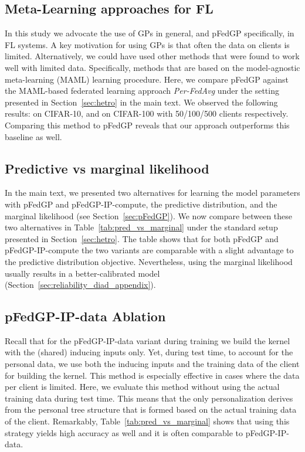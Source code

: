 \documentclass{article}
\def\Secref#1{Section~\ref{#1}}
\newcommand{\tblref}[1]{Table~\ref{#1}}
\begin{document}
\subsection{Meta-Learning approaches for FL}
In this study we advocate the use of GPs in general, and pFedGP specifically, in FL systems. A key motivation for using GPs is that often the data on clients is limited. Alternatively, we could have used other methods that were found to work well with limited data. Specifically, methods that are based on the model-agnostic meta-learning (MAML) \cite{li2017meta} learning procedure. Here, we compare pFedGP against the MAML-based federated learning approach \textit{Per-FedAvg} \cite{Fallah2020PersonalizedFL} under the setting presented in \Secref{sec:hetro} in the main text. We observed the following results:  on CIFAR-10, and  on CIFAR-100 with 50/100/500 clients respectively. Comparing this method to pFedGP reveals that our approach outperforms this baseline as well.


\subsection{Predictive vs marginal likelihood}
In the main text, we presented two alternatives for learning the model parameters with pFedGP and pFedGP-IP-compute, the predictive distribution, and the marginal likelihood (see \Secref{sec:pFedGP}). We now compare between these two alternatives in \tblref{tab:pred_vs_marginal} under the standard setup presented in \Secref{sec:hetro}. The table shows that for both pFedGP and pFedGP-IP-compute the two variants are comparable with a slight advantage to the predictive distribution objective. Nevertheless, using the marginal likelihood usually results in a better-calibrated model (\Secref{sec:reliability_diad_appendix}).

\subsection{pFedGP-IP-data Ablation} \label{sec_app:pFedGP_data_wo_pers}
Recall that for the pFedGP-IP-data variant during training we build the kernel with the (shared) inducing inputs only. Yet, during test time, to account for the personal data, we use both the inducing inputs and the training data of the client for building the kernel. This method is especially effective in cases where the data per client is limited. Here, we evaluate this method without using the actual training data during test time. This means that the only personalization derives from the personal tree structure that is formed based on the actual training data of the client. Remarkably, \tblref{tab:pred_vs_marginal} shows that using this strategy yields high accuracy as well and it is often comparable to pFedGP-IP-data.
\end{document}

